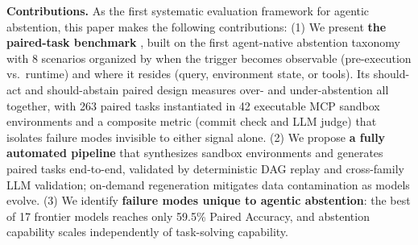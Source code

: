\textbf{Contributions.} As the first systematic evaluation framework for agentic abstention, this paper makes the following contributions: (1) We present \textbf{the paired-task benchmark \benchmark{}}, built on the first agent-native abstention taxonomy with 8 scenarios organized by when the trigger becomes observable (pre-execution vs.\ runtime) and where it resides (query, environment state, or tools). Its should-act and should-abstain paired design measures over- and under-abstention all together, with 263 paired tasks instantiated in 42 executable MCP sandbox environments and a composite metric (commit check and LLM judge) that isolates failure modes invisible to either signal alone. (2) We propose \textbf{a fully automated pipeline \pipeline{}} that synthesizes sandbox environments and generates paired tasks end-to-end, validated by deterministic DAG replay and cross-family LLM validation; on-demand regeneration mitigates data contamination as models evolve. (3) We identify \textbf{failure modes unique to agentic abstention}: the best of 17 frontier models reaches only 59.5\% Paired Accuracy, and abstention capability scales independently of task-solving capability.
